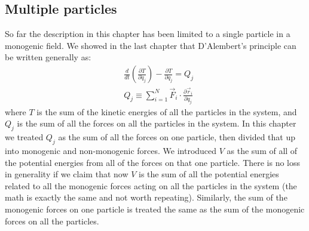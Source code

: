 \subsection{Multiple particles}
So far the description in this chapter has been limited to a single particle in a monogenic field. We showed in the last chapter that D'Alembert's principle can be written generally as:
\begin{align}
&\frac{d}{dt}\left(\frac{\partial T}{\partial \dot{q}_j} \right) - \frac{\partial T}{\partial q_j}=Q_j\nonumber\\
&Q_j\equiv \sum_{i=1}^N\vec{F}_i\cdot\frac{\partial\vec{r}_i}{\partial q_j}
\end{align}
where $T$ is the sum of the kinetic energies of all the particles in the system, and $Q_j$ is the sum of all the forces on all the particles in the system. In this chapter we treated $Q_j$ as the sum of all the forces on one particle, then divided that up into monogenic and non-monogenic forces. We introduced $V$ as the sum of all of the potential energies from all of the forces on that one particle. There is no loss in generality if we claim that now $V$ is the sum of all the potential energies related to all the monogenic forces acting on all the particles in the system (the math is exactly the same and not worth repeating). Similarly, the sum of the monogenic forces on one particle is treated the same as the sum of the monogenic forces on all the particles.


